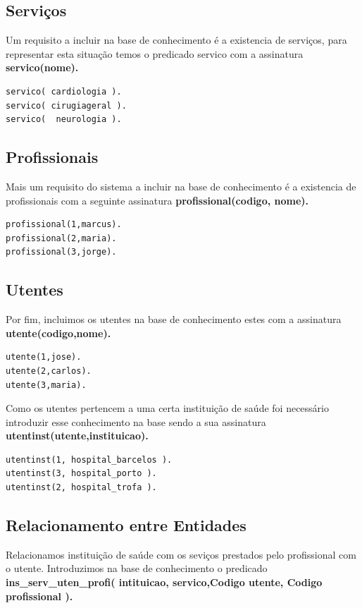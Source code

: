 \subsection{Serviços}
Um requisito a incluir na base de conhecimento é a existencia de serviços, para representar esta situação temos o predicado servico com a assinatura \textbf{servico(nome).}


\begin{Verbatim}
servico( cardiologia ). 
servico( cirugiageral ).
servico(  neurologia ).
\end{Verbatim}

\subsection{Profissionais}
Mais um requisito do sistema a incluir na base de conhecimento é a existencia de profissionais com a seguinte assinatura \textbf{profissional(codigo, nome).}


\begin{Verbatim}
profissional(1,marcus).
profissional(2,maria).
profissional(3,jorge).
\end{Verbatim}

\subsection{Utentes }
Por fim, incluimos os utentes na base de conhecimento estes com a assinatura \textbf{utente(codigo,nome).}

\begin{Verbatim}
utente(1,jose).  
utente(2,carlos). 
utente(3,maria). 
\end{Verbatim}

Como os utentes pertencem a uma certa instituição de saúde foi necessário introduzir esse conhecimento na base sendo a sua assinatura \textbf{utentinst(utente,instituicao).}

\begin{verbatim}
utentinst(1, hospital_barcelos ). 
utentinst(3, hospital_porto ).
utentinst(2, hospital_trofa ). 
\end{verbatim}

\subsection{Relacionamento entre Entidades}
Relacionamos instituição de saúde com os seviços prestados pelo profissional com o utente. Introduzimos na base de conhecimento o predicado \textbf{ins\_serv\_uten\_profi( intituicao, servico,Codigo utente, Codigo profissional ).} 

